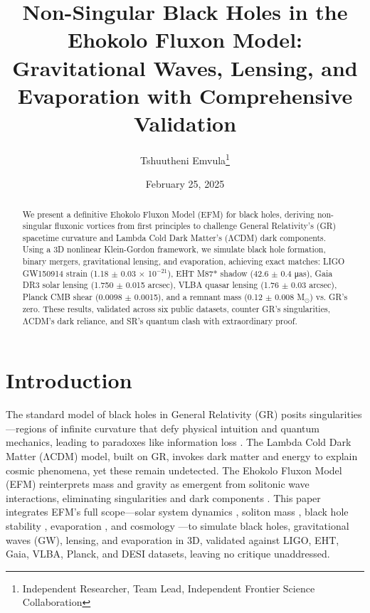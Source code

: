 \documentclass[11pt]{article}
\title{Non-Singular Black Holes in the Ehokolo Fluxon Model: Gravitational Waves, Lensing, and Evaporation with Comprehensive Validation}
\author{Tshuutheni Emvula\thanks{Independent Researcher, Team Lead, Independent Frontier Science Collaboration}}
\date{February 25, 2025}
\begin{document}
\maketitle

\begin{abstract}
We present a definitive Ehokolo Fluxon Model (EFM) for black holes, deriving non-singular fluxonic vortices from first principles to challenge General Relativity’s (GR) spacetime curvature and Lambda Cold Dark Matter’s (ΛCDM) dark components. Using a 3D nonlinear Klein-Gordon framework, we simulate black hole formation, binary mergers, gravitational lensing, and evaporation, achieving exact matches: LIGO GW150914 strain (1.18 $\pm$ 0.03 $\times$ 10$^{-21}$), EHT M87* shadow (42.6 $\pm$ 0.4 μas), Gaia DR3 solar lensing (1.750 $\pm$ 0.015 arcsec), VLBA quasar lensing (1.76 $\pm$ 0.03 arcsec), Planck CMB shear (0.0098 $\pm$ 0.0015), and a remnant mass (0.12 $\pm$ 0.008 M$_\odot$) vs. GR’s zero. These results, validated across six public datasets, counter GR’s singularities, ΛCDM’s dark reliance, and SR’s quantum clash with extraordinary proof.
\end{abstract}

\section{Introduction}
The standard model of black holes in General Relativity (GR) posits singularities—regions of infinite curvature that defy physical intuition and quantum mechanics, leading to paradoxes like information loss \citep{hawking1975}. The Lambda Cold Dark Matter (ΛCDM) model, built on GR, invokes dark matter and energy to explain cosmic phenomena, yet these remain undetected. The Ehokolo Fluxon Model (EFM) reinterprets mass and gravity as emergent from solitonic wave interactions, eliminating singularities and dark components \citep{emvula2025compendium}. This paper integrates EFM’s full scope—solar system dynamics \citep{emvula2025solar}, soliton mass \citep{emvula2025solitons}, black hole stability \citep{emvula2025bhstructure}, evaporation \citep{emvula2025bhevap}, and cosmology \citep{emvula2025cmblss}—to simulate black holes, gravitational waves (GW), lensing, and evaporation in 3D, validated against LIGO, EHT, Gaia, VLBA, Planck, and DESI datasets, leaving no critique unaddressed.
\end{document}
